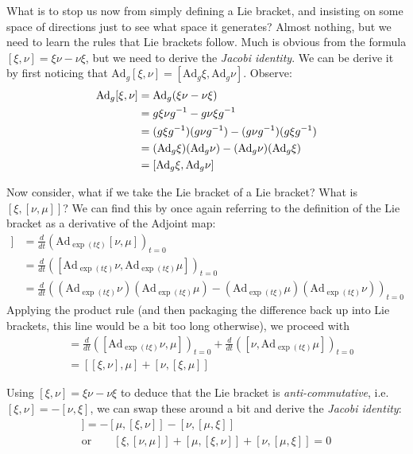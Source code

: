 \documentclass[11pt]{article}
\begin{document}
What is to stop us now from simply defining a Lie bracket, and insisting on some space of directions just to see what space it generates? Almost nothing, but we need to learn the rules that Lie brackets follow. Much is obvious from the formula $[\xi,\nu] = \xi\nu - \nu\xi$, but we need to derive the \emph{Jacobi identity}. We can be derive it by first noticing that $\mathrm{Ad}_g [\xi,\nu] = [\mathrm{Ad}_g\xi, \mathrm{Ad}_g\nu]$. Observe: \begin{align*}
\mathrm{Ad}_g[\xi,\nu] &= \mathrm{Ad}_g (\xi\nu - \nu \xi) \\
&= g\xi\nu g^{-1} - g \nu \xi g^{-1} \\
&= (g \xi g^{-1}) (g \nu g^{-1}) - (g \nu g^{-1}) (g \xi g^{-1}) \\
&= (\mathrm{Ad}_g \xi) (\mathrm{Ad}_g \nu) - (\mathrm{Ad}_g \nu) (\mathrm{Ad}_g \xi) \\
&= [ \mathrm{Ad}_g \xi , \mathrm{Ad}_g \nu]
\end{align*}

Now consider, what if we take the Lie bracket of a Lie bracket? What is $[\xi,[\nu,\mu]]$? We can find this by once again referring to the definition of the Lie bracket as a derivative of the Adjoint map: \begin{align*}
[\xi,[\nu, \mu]] &= \frac{d}{dt} \left( \mathrm{Ad}_{\exp(t\xi)}[\nu,\mu]\right)_{t=0} \\
&= \frac{d}{dt} \left( [\mathrm{Ad}_{\exp(t\xi)}\nu, \mathrm{Ad}_{\exp(t\xi)}\mu]\right)_{t=0} \\
&= \frac{d}{dt} \left( (\mathrm{Ad}_{\exp(t\xi)}\nu) (\mathrm{Ad}_{\exp(t\xi)}\mu) - (\mathrm{Ad}_{\exp(t\xi)}\mu)(\mathrm{Ad}_{\exp(t\xi)}\nu) \right)_{t=0}
\end{align*}
Applying the product rule (and then packaging the difference back up into Lie brackets, this line would be a bit too long otherwise), we proceed with \begin{align*}
&= \frac{d}{dt} \left( [\mathrm{Ad}_{\exp(t\xi)}\nu, \mu] \right)_{t=0} + \frac{d}{dt} \left( [\nu, \mathrm{Ad}_{\exp(t\xi)}\mu] \right)_{t=0} \\
&= [[\xi,\nu],\mu] + [\nu,[\xi,\mu]] 
\end{align*}

Using $[\xi,\nu] = \xi\nu - \nu \xi$ to deduce that the Lie bracket is \emph{anti-commutative}, i.e. $[\xi,\nu]= -[\nu,\xi]$, we can swap these around a bit and derive the \emph{Jacobi identity}: \begin{gather*}
[\xi,[\nu,\mu]] = - [\mu,[\xi,\nu]] - [\nu,[\mu,\xi]] \\
\text{or} \hspace{2em} [\xi,[\nu,\mu]] + [\mu,[\xi,\nu]] + [\nu,[\mu,\xi]]= 0
\end{gather*}
\end{document}
